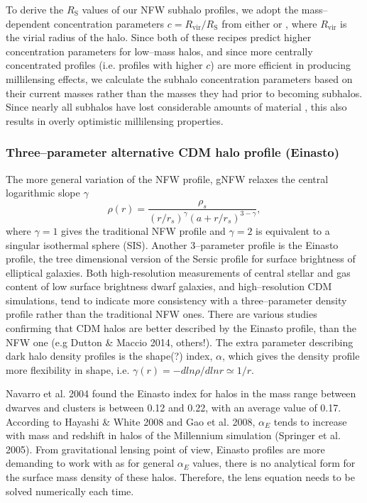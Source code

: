 \documentclass[paper=a4, fontsize=11pt]{scrartcl} %
\numberwithin{equation}{section} %
\numberwithin{figure}{section} %
\numberwithin{table}{section} %
\begin{document}
To derive the $R_\mathrm{S}$ values of our NFW subhalo profiles, we adopt the mass--dependent concentration parameters $c=R_\mathrm{vir}/R_\mathrm{S}$ from either \cite{Bullock+2001?} or \cite{Maccio+1998?}, where $R_\mathrm{vir}$ is the virial radius of the halo. Since both of these recipes predict higher concentration parameters for low--mass halos, and since more centrally concentrated profiles (i.e. profiles with higher $c$) are more efficient in producing millilensing effects, we calculate the subhalo concentration parameters based on their current masses rather than the masses they had prior to becoming subhalos. Since nearly all subhalos have lost considerable amounts of material \cite[e.g.][]{Vale-Ostriker}, this also results in overly optimistic millilensing properties. 

\subsubsection*{Three--parameter alternative CDM halo profile (Einasto)}
The more general variation of the NFW profile, gNFW relaxes the central logarithmic slope $\gamma$
\begin{equation}
\rho(r) = \frac{\rho_s}{(r / r_s)^\gamma(a + r/r_s)^{3-\gamma}},
\end{equation}
where $\gamma = 1$ gives the traditional NFW profile and $\gamma = 2$ is equivalent to a singular isothermal sphere (SIS).
Another 3--parameter profile is the Einasto profile, the tree dimensional version of the Sersic profile for surface brightness of elliptical galaxies. Both high-resolution measurements of central stellar and gas content of low surface brightness dwarf galaxies, and high--resolution CDM simulations, tend to indicate more consistency with a three--parameter density profile rather than the traditional NFW ones. There are various studies confirming that CDM halos are better described by the Einasto profile, than the NFW one (e.g Dutton \& Maccio 2014, others!). The extra parameter describing dark halo density profiles is the shape(?) index, $\alpha$, which gives the density profile more flexibility in shape, i.e. $\gamma(r) = -dln\rho/dlnr \simeq 1/r$. 

Navarro et al. 2004 found the Einasto index for halos in the mass range between dwarves and clusters is between 0.12 and 0.22, with an average value of 0.17. According to Hayashi \& White 2008 and Gao et al. 2008, $\alpha_E$ tends to increase with mass and redshift in halos of the Millennium simulation (Springer et al. 2005). From gravitational lensing point of view, Einasto profiles are more demanding to work with as for general $\alpha_E$ values, there is no analytical form for the surface mass density of these halos. Therefore, the lens equation needs to be solved numerically each time.
\end{document}
